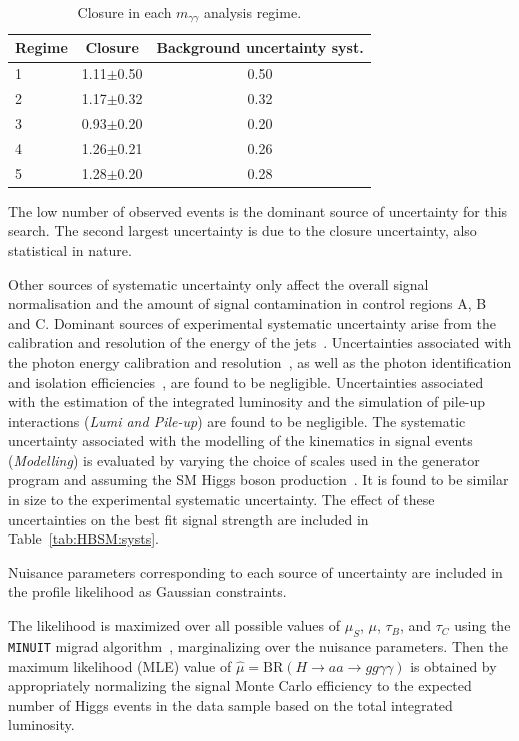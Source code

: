 \begin{table}[htbp]
  \begin{center}
    \caption{Closure in each $m_{\gamma\gamma}$ analysis regime.}
  \label{tab:HBSM:closure_uncertainty}
    {\footnotesize
  \begin{tabular}{ l c c }
    \toprule
    Regime & Closure & Background uncertainty syst. \\
    \midrule
    1 & 1.11$\pm$0.50 & 0.50 \\
    2 & 1.17$\pm$0.32 & 0.32 \\
    3 & 0.93$\pm$0.20 & 0.20 \\
    4 & 1.26$\pm$0.21 & 0.26 \\
    5 & 1.28$\pm$0.20 & 0.28 \\
    \bottomrule
  \end{tabular}
    }
  \end{center}
\end{table}

The low number of observed events is the dominant source of uncertainty for this search.
The second largest uncertainty is due to the closure uncertainty, also statistical in nature.

Other sources of systematic uncertainty only affect the overall signal normalisation and the amount of signal contamination
in control regions A, B and C.
Dominant sources of experimental systematic uncertainty arise from the calibration and resolution of the energy of the 
jets~\cite{PERF-2016-04,PERF-2011-04}. 
Uncertainties associated with the photon energy calibration and resolution~\cite{PERF-2013-05}, as well as the photon identification and isolation
efficiencies~\cite{PERF-2013-04}, are found to be negligible. Uncertainties associated 
with the estimation of the integrated luminosity and the simulation of pile-up interactions (\textit{Lumi and Pile-up})
are found to be negligible. 
The systematic uncertainty associated with the modelling of the kinematics in signal 
events (\textit{Modelling}) is evaluated by varying the choice of scales used in the generator program and
assuming the SM Higgs boson production~\cite{Heinemeyer:2013tqa}.
It is found to be similar in size to the experimental systematic uncertainty.
The effect of these uncertainties on the best fit signal strength are included in Table~\ref{tab:HBSM:systs}.

Nuisance parameters corresponding to each source of uncertainty are included in the profile likelihood as Gaussian constraints.

The likelihood is maximized over all possible values of $\mu_S$, $\mu$, $\tau_B$, and $\tau_C$ using the \texttt{MINUIT} migrad algorithm~\cite{James:1975dr}, marginalizing over the nuisance parameters.
Then the maximum likelihood (MLE) value of $\hat{\mu} = \text{BR}(H\rightarrow aa\rightarrow gg\gamma\gamma)$ is obtained by appropriately 
normalizing the signal Monte Carlo efficiency to the expected number of Higgs events in the data sample based on the total integrated luminosity.

